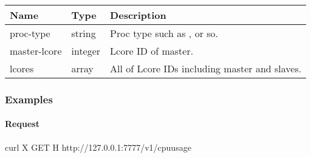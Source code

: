 \documentclass[a4paper,11pt,openany,oneside,english]{sphinxmanual}
\begin{document}
\begin{savenotes}\sphinxattablestart
\centering
{}
\sphinxthecaptionisattop
{}\label{\detokenize{api_ref/proc_independ:id15}}\label{\detokenize{api_ref/proc_independ:table-spp-ctl-cpu-usage-params}}
\sphinxaftertopcaption
\begin{tabulary}{\linewidth}[t]{|T|T|T|}
\hline
\sphinxstyletheadfamily 
Name
&\sphinxstyletheadfamily 
Type
&\sphinxstyletheadfamily 
Description
\\
\hline
proc-type
&
string
&
Proc type such as ,  or so.
\\
\hline
master-lcore
&
integer
&
Lcore ID of master.
\\
\hline
lcores
&
array
&
All of Lcore IDs including master and slaves.
\\
\hline
\end{tabulary}
\par
\sphinxattableend\end{savenotes}


\subsubsection{Examples}
\label{\detokenize{api_ref/proc_independ:id7}}

\paragraph{Request}
\label{\detokenize{api_ref/proc_independ:id8}}
\begin{sphinxVerbatim}[commandchars=\\\{\},formatcom=\footnotesize]
 curl \PYGZhy{}X GET \PYGZhy{}H  
http://127.0.0.1:7777/v1/cpu\PYGZus{}usage
\end{sphinxVerbatim}
\end{document}
